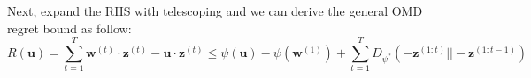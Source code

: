 \documentclass[11pt]{article}
\begin{document}
Next, expand the RHS with telescoping and we can derive the general OMD regret bound as follow:
$$
R(\bm{u}) = \sum_{t=1}^T \bm{w}^{(t)} \cdot \bm{z}^{(t)} - \bm{u} \cdot \bm{z}^{(t)}
\leq \psi(\bm{u}) - \psi(\bm{w}^{(1)}) + \sum_{t=1}^{T} D_{\psi^*}(-\bm{z}^{(1:t)} || -\bm{z}^{(1:t-1)})
$$






        



\end{document}
